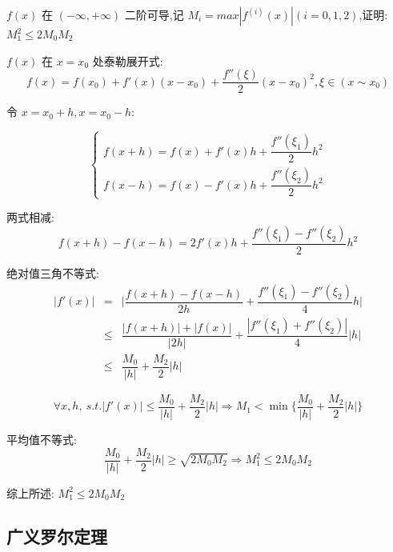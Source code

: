 \begin{proposition}
	$f(x)$ 在 $(-\infty,+\infty)$ 二阶可导,记 $M_{i}=max|f^{(i)}(x)|(i=0,1,2)$,证明: $M_{1}^2\leq 2M_{0}M_{2}$
\end{proposition}
\begin{solution}

	$f(x)$ 在 $x = x_{0}$ 处泰勒展开式:
	$$f(x) = f(x_{0}) + f'(x)(x-x_{0}) + \dfrac{f''(\xi)}{2}(x-x_{0})^{2}, \xi\in(x\sim x_{0})$$

	令 $x = x_{0} + h, x = x_{0} - h$:

	$$\begin{cases}
		f(x+h) = f(x) + f'(x)h + \dfrac{f''(\xi_{1})}{2}h^2\\
		f(x-h) = f(x) - f'(x)h + \dfrac{f''(\xi_{2})}{2}h^2
	\end{cases}$$

	两式相减:
	$$f(x+h)-f(x-h)=2f'(x)h+\dfrac{f''(\xi_{1})-f''(\xi_{2})}{2}h^2$$

	绝对值三角不等式:
	\begin{eqnarray*}
		|f'(x)| &   =  & \big|\dfrac{f(x+h)-f(x-h)}{2h}+\dfrac{f''(\xi_{1})-f''(\xi_{2})}{4}h\big|\\
				& \leq & \dfrac{|f(x+h)|+|f(x)|}{|2h|} + \dfrac{|f''(\xi_{1})+f''(\xi_{2})|}{4}|h|\\
				& \leq & \dfrac{M_{0}}{|h|} + \dfrac{M_{2}}{2}|h| 
	\end{eqnarray*}

	$$\forall x,h,\ s.t. |f'(x)| \leq \dfrac{M_{0}}{|h|} + \dfrac{M_{2}}{2}|h|\Rightarrow M_{1} < \min\{\dfrac{M_{0}}{|h|} + \dfrac{M_{2}}{2}|h|\}$$
	
	平均值不等式:
	$$\dfrac{M_{0}}{|h|} + \dfrac{M_{2}}{2}|h| \geq  \sqrt{2M_{0}M_{2}}\Rightarrow M_{1}^{2} \leq 2M_{0}M_{2}$$
	
	综上所述: $M_{1}^2\leq 2M_{0}M_{2}$
\end{solution}

\subsection{广义罗尔定理}

